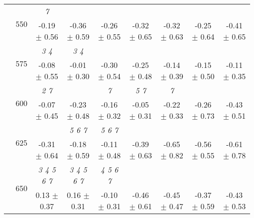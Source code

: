 \begin{table}[h]
{\begin{tabular}{
        ccccccccc}
 & \multirow{2}{*}{550}& \textit{ 7 }& & & & & &  \\ 
 & & -0.19 $\pm$ 0.56& -0.36 $\pm$ 0.59& -0.26 $\pm$ 0.55& -0.32 $\pm$ 0.65& -0.32 $\pm$ 0.63& -0.25 $\pm$ 0.64& -0.41 $\pm$ 0.65 \\ 
 & \multirow{2}{*}{575}& \cellcolor[HTML]{EFEFEF} \textit{ 3 4 }& \cellcolor[HTML]{EFEFEF} \textit{ 3 4 }& \cellcolor[HTML]{EFEFEF} & \cellcolor[HTML]{EFEFEF} & \cellcolor[HTML]{EFEFEF} & \cellcolor[HTML]{EFEFEF} & \cellcolor[HTML]{EFEFEF}  \\ 
 & & \cellcolor[HTML]{EFEFEF} -0.08 $\pm$ 0.55& \cellcolor[HTML]{EFEFEF} -0.01 $\pm$ 0.30& \cellcolor[HTML]{EFEFEF} -0.30 $\pm$ 0.54& \cellcolor[HTML]{EFEFEF} -0.25 $\pm$ 0.48& \cellcolor[HTML]{EFEFEF} -0.14 $\pm$ 0.39& \cellcolor[HTML]{EFEFEF} -0.15 $\pm$ 0.50& \cellcolor[HTML]{EFEFEF} -0.11 $\pm$ 0.35 \\ 
 & \multirow{2}{*}{600}& \textit{ 2 7 }& & \textit{ 7 }& \textit{ 5 7 }& \textit{ 7 }& &  \\ 
 & & -0.07 $\pm$ 0.45& -0.23 $\pm$ 0.48& -0.16 $\pm$ 0.32& -0.05 $\pm$ 0.31& -0.22 $\pm$ 0.33& -0.26 $\pm$ 0.73& -0.43 $\pm$ 0.51 \\ 
 & \multirow{2}{*}{625}& \cellcolor[HTML]{EFEFEF} & \cellcolor[HTML]{EFEFEF} \textit{ 5 6 7 }& \cellcolor[HTML]{EFEFEF} \textit{ 5 6 7 }& \cellcolor[HTML]{EFEFEF} & \cellcolor[HTML]{EFEFEF} & \cellcolor[HTML]{EFEFEF} & \cellcolor[HTML]{EFEFEF}  \\ 
 & & \cellcolor[HTML]{EFEFEF} -0.31 $\pm$ 0.64& \cellcolor[HTML]{EFEFEF} -0.18 $\pm$ 0.59& \cellcolor[HTML]{EFEFEF} -0.11 $\pm$ 0.48& \cellcolor[HTML]{EFEFEF} -0.39 $\pm$ 0.63& \cellcolor[HTML]{EFEFEF} -0.65 $\pm$ 0.82& \cellcolor[HTML]{EFEFEF} -0.56 $\pm$ 0.55& \cellcolor[HTML]{EFEFEF} -0.61 $\pm$ 0.78 \\ 
 & \multirow{2}{*}{650}& \textit{ 3 4 5 6 7 }& \textit{ 3 4 5 6 7 }& \textit{ 4 5 6 7 }& & & &  \\ 
 & & 0.13 $\pm$ 0.37& 0.16 $\pm$ 0.31& -0.10 $\pm$ 0.31& -0.46 $\pm$ 0.61& -0.45 $\pm$ 0.47& -0.37 $\pm$ 0.59& -0.43 $\pm$ 0.53 \\ \midrule 

        \bottomrule
        \end{tabular}%
        }

        \end{table}
        
